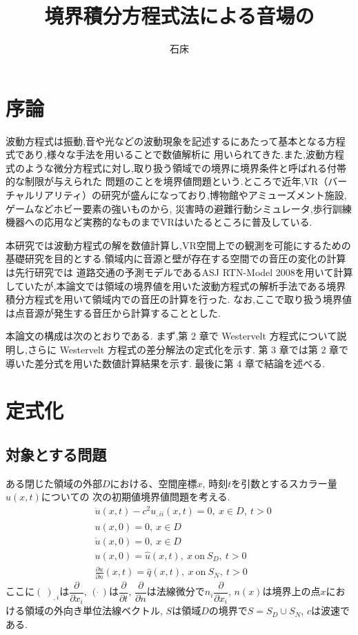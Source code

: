 \documentclass[dvipdfmx]{ampbt}
\title{境界積分方程式法による音場の}     %
      {数値解析と移動する受音点におけるて}      %
      {リアルタイム可聴化につい}                %
\author{石床}{竜一}             %
\begin{document}
\ifoutputbody
\makeinsidecover                %
\makeabstract                   %
\maketoc                        %
\setcounter{page}{1}            %
\section{序論}
波動方程式は振動,音や光などの波動現象を記述するにあたって基本となる方程式であり,様々な手法を用いることで数値解析に
用いられてきた.また,波動方程式のような微分方程式に対し,取り扱う領域での境界に境界条件と呼ばれる付帯的な制限が与えられた
問題のことを境界値問題という.ところで近年,VR（バーチャルリアリティ）の研究が盛んになっており,博物館やアミューズメント施設,ゲームなどホビー要素の強いものから,
災害時の避難行動シミュレータ\cite{vrsaigai},歩行訓練機器への応用\cite{vrmedical}など実務的なものまでVRはいたるところに普及している.\par
本研究では波動方程式の解を数値計算し,VR空間上での観測を可能にするための基礎研究を目的とする.領域内に音源と壁が存在する空間での音圧の変化の計算は先行研究\cite{vrsound}では
道路交通の予測モデルであるASJ RTN-Model 2008を用いて計算していたが,本論文では領域の境界値を用いた波動方程式の解析手法である境界積分方程式を用いて領域内での音圧の計算を行った.
なお,ここで取り扱う境界値は点音源が発生する音圧から計算することとした.\par

本論文の構成は次のとおりである.
まず,第 2 章で Westervelt 方程式について説明し,さらに Westervelt 方程式の差分解法の定式化を示す.
第 3 章では第 2 章で導いた差分式を用いた数値計算結果を示す.
最後に第 4 章で結論を述べる.

\section{定式化}
\label{2章}
\subsection{対象とする問題}
ある閉じた領域の外部$D$における、空間座標$x$, 時刻$t$を引数とするスカラー量$u(x,t)$についての
次の初期値境界値問題を考える.
\begin{align}
&\ddot{u}(x,t)-c^2 u_{,ii}(x,t)=0,\  x \in D,\ t>0 \\
&u(x,0)=0,\  x \in D \\
&\dot{u}(x,0)=0,\  x \in D \\
&u(x,0)=\hat{u}(x,t),\  x\  \mbox{on} \ S_D,\ t>0 \\
&\frac{\partial{u}}{\partial{n}} (x,t)=\hat{q}(x,t),\  x\  \mbox{on} \ S_N,\ t>0
\end{align}
ここに$(\ )_{,i}$は$\dfrac{\partial{}}{\partial{x_i}}$,
$(\dot{\ })$は$\dfrac{\partial{}}{\partial{t}}$,
$\dfrac{\partial{}}{\partial{n}}$は法線微分で$n_i \dfrac{\partial{}}{\partial{x_i}}$,
$n(x)$は境界上の点$x$における領域の外向き単位法線ベクトル,
$S$は領域$D$の境界で$S=S_D \cup S_N$,
$c$は波速である.
\end{document}
